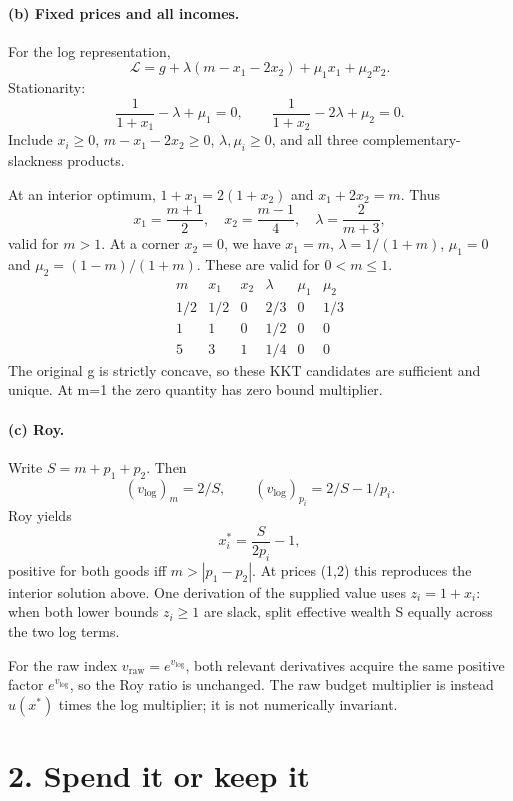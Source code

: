 \documentclass[11pt,a4paper]{article}
\begin{document}
\paragraph{(b) Fixed prices and all incomes.}
For the log representation,
\[
 \mathcal L=g+\lambda(m-x_1-2x_2)+\mu_1x_1+\mu_2x_2.
\]
Stationarity:
\[
 \frac1{1+x_1}-\lambda+\mu_1=0,\qquad
 \frac1{1+x_2}-2\lambda+\mu_2=0.
\]
Include $x_i\ge0$, $m-x_1-2x_2\ge0$, $\lambda,\mu_i\ge0$, and all three complementary-slackness products.

At an interior optimum, $1+x_1=2(1+x_2)$ and $x_1+2x_2=m$. Thus
\[
 x_1=\frac{m+1}{2},\quad x_2=\frac{m-1}{4},\quad\lambda=\frac2{m+3},
\]
valid for $m>1$. At a corner $x_2=0$, we have $x_1=m$, $\lambda=1/(1+m)$, $\mu_1=0$ and $\mu_2=(1-m)/(1+m)$. These are valid for $0<m\le1$.
\[
 \begin{array}{c|ccccc}
 m&x_1&x_2&\lambda&\mu_1&\mu_2\\\hline
 1/2&1/2&0&2/3&0&1/3\\
 1&1&0&1/2&0&0\\
 5&3&1&1/4&0&0
 \end{array}
\]
The original g is strictly concave, so these KKT candidates are sufficient and unique. At m=1 the zero quantity has zero bound multiplier.
\paragraph{(c) Roy.}
Write $S=m+p_1+p_2$. Then
\[
 (v_{\log})_m=2/S,\qquad (v_{\log})_{p_i}=2/S-1/p_i.
\]
Roy yields
\[
 x_i^*=\frac{S}{2p_i}-1,
\]
positive for both goods iff $m>|p_1-p_2|$. At prices (1,2) this reproduces the interior solution above. One derivation of the supplied value uses $z_i=1+x_i$: when both lower bounds $z_i\ge1$ are slack, split effective wealth S equally across the two log terms.

For the raw index $v_{\mathrm{raw}}=e^{v_{\log}}$, both relevant derivatives acquire the same positive factor $e^{v_{\log}}$, so the Roy ratio is unchanged. The raw budget multiplier is instead $u(x^*)$ times the log multiplier; it is not numerically invariant.
\clearpage
\section*{2. Spend it or keep it}
\end{document}
